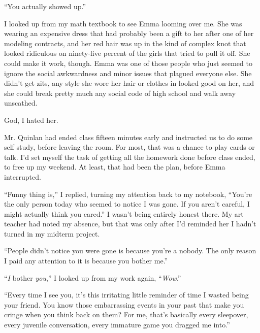 





``You actually showed up.''



I looked up from my math textbook to see Emma looming over me.  She was wearing an expensive dress that had probably been a gift to her after one of her modeling contracts, and her red hair was up in the kind of complex knot that looked ridiculous on ninety-five percent of the girls that tried to pull it off.  She could make it work, though.  Emma was one of those people who just seemed to ignore the social awkwardness and minor issues that plagued everyone else.  She didn't get zits, any style she wore her hair or clothes in looked good on her, and she could break pretty much any social code of high school and walk away unscathed.



God, I hated her.



Mr. Quinlan had ended class fifteen minutes early and instructed us to do some self study, before leaving the room.  For most, that was a chance to play cards or talk.  I'd set myself the task of getting all the homework done before class ended, to free up my weekend.  At least, that had been the plan, before Emma interrupted.



``Funny thing is,'' I replied, turning my attention back to my notebook, ``You're the only person today who seemed to notice I was gone.  If you aren't careful, I might actually think you cared.''  I wasn't being entirely honest there.  My art teacher had noted my absence, but that was only after I'd reminded her I hadn't turned in my midterm project.



``People didn't notice you were gone is because you're a nobody.  The only reason I paid any attention to it is because you bother me.''



``\emph{I }bother \emph{you},'' I looked up from my work again, ``\emph{Wow}.''



``Every time I see you, it's this irritating little reminder of time I wasted being your friend.  You know those embarrassing events in your past that make you cringe when you think back on them?  For me, that's basically every sleepover, every juvenile conversation, every immature game you dragged me into.''



